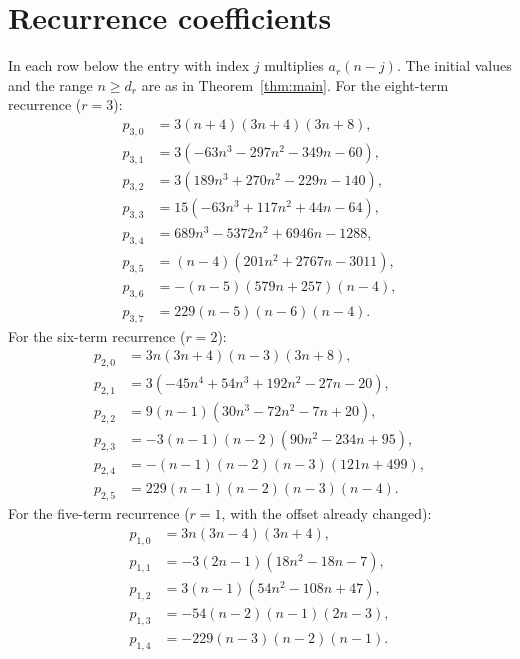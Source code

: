 \documentclass[11pt]{article}
\begin{document}
\section{Recurrence coefficients}\label{sec:coefficients}
In each row below the entry with index $j$ multiplies $a_r(n-j)$.
The initial values and the range $n\geq d_r$ are as in Theorem~\ref{thm:main}.
For the eight-term recurrence ($r=3$):
\begin{align*}
p_{3,0}&=3(n+4)(3n+4)(3n+8),\\
p_{3,1}&=3(-63n^3-297n^2-349n-60),\\
p_{3,2}&=3(189n^3+270n^2-229n-140),\\
p_{3,3}&=15(-63n^3+117n^2+44n-64),\\
p_{3,4}&=689n^3-5372n^2+6946n-1288,\\
p_{3,5}&=(n-4)(201n^2+2767n-3011),\\
p_{3,6}&=-(n-5)(579n+257)(n-4),\\
p_{3,7}&=229(n-5)(n-6)(n-4).
\end{align*}
For the six-term recurrence ($r=2$):
\begin{align*}
p_{2,0}&=3n(3n+4)(n-3)(3n+8),\\
p_{2,1}&=3(-45n^4+54n^3+192n^2-27n-20),\\
p_{2,2}&=9(n-1)(30n^3-72n^2-7n+20),\\
p_{2,3}&=-3(n-1)(n-2)(90n^2-234n+95),\\
p_{2,4}&=-(n-1)(n-2)(n-3)(121n+499),\\
p_{2,5}&=229(n-1)(n-2)(n-3)(n-4).
\end{align*}
For the five-term recurrence ($r=1$, with the offset already changed):
\begin{align*}
p_{1,0}&=3n(3n-4)(3n+4),\\
p_{1,1}&=-3(2n-1)(18n^2-18n-7),\\
p_{1,2}&=3(n-1)(54n^2-108n+47),\\
p_{1,3}&=-54(n-2)(n-1)(2n-3),\\
p_{1,4}&=-229(n-3)(n-2)(n-1).
\end{align*}
\end{document}
